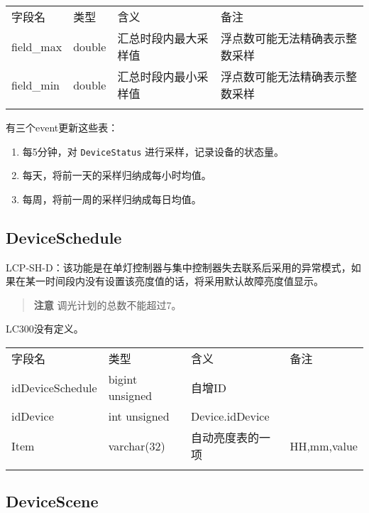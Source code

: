 \begin{longtabu}[c]{@{}lXXX@{}}
\toprule\addlinespace
字段名 & 类型 & 含义 & 备注
\\\addlinespace
\midrule\endhead
field\_max & double & 汇总时段内最大采样值 &
浮点数可能无法精确表示整数采样
\\\addlinespace
field\_min & double & 汇总时段内最小采样值 &
浮点数可能无法精确表示整数采样
\\\addlinespace
\bottomrule
\end{longtabu}

有三个event更新这些表：

\begin{enumerate}
\def\labelenumi{\arabic{enumi}.}
\itemsep1pt\parskip0pt
\item
  每5分钟，对 \texttt{DeviceStatus} 进行采样，记录设备的状态量。
\item
  每天，将前一天的采样归纳成每小时均值。
\item
  每周，将前一周的采样归纳成每日均值。
\end{enumerate}

\subsection{DeviceSchedule}\label{deviceschedule}

LCP-SH-D：该功能是在单灯控制器与集中控制器失去联系后采用的异常模式，如果在某一时间段内没有设置该亮度值的话，将采用默认故障亮度值显示。

\begin{quote}
\textbf{注意} 调光计划的总数不能超过7。
\end{quote}

LC300没有定义。

\begin{longtabu}[c]{@{}lXXX@{}}
\toprule\addlinespace
字段名 & 类型 & 含义 & 备注
\\\addlinespace
\midrule\endhead
idDeviceSchedule & bigint unsigned & 自增ID &
\\\addlinespace
idDevice & int unsigned & Device.idDevice &
\\\addlinespace
Item & varchar(32) & 自动亮度表的一项 & HH,mm,value
\\\addlinespace
\bottomrule
\end{longtabu}

\subsection{DeviceScene}\label{devicescene}

